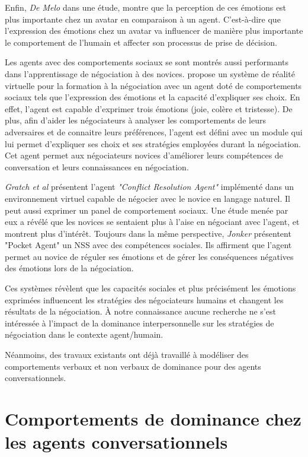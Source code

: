 	Enfin, \emph{De Melo} \cite{de2015humans} dans une étude, montre que la perception de ces émotions est plus importante chez un avatar en comparaison à un agent. C'est-à-dire que l'expression des émotions chez un avatar va influencer de manière plus importante le comportement de l'humain et affecter son processus de prise de décision.  
	
	Les agents avec des comportements sociaux se sont montrés aussi performants dans l'apprentissage de négociation à des novices. \cite{broekens2012virtual} propose un système de réalité virtuelle pour la formation à la négociation avec un agent doté de comportements sociaux tels que l'expression des émotions et la capacité d'expliquer ses choix. En effet, l'agent est capable d'exprimer trois émotions (joie, colère et tristesse). De plus, afin d'aider les négociateurs à analyser les comportements de leurs adversaires et de connaitre leurs préférences, l'agent est défini avec un module qui lui permet d'expliquer ses choix et ses stratégies employées durant la négociation. Cet agent permet aux négociateurs novices d'améliorer leurs compétences de conversation et leurs connaissances en négociation. 
	
	\emph{Gratch et al} \cite{gratch2016benefits} présentent l'agent \textit{"Conflict Resolution Agent"} implémenté dans un environnement virtuel capable de négocier avec le novice en langage naturel. Il peut aussi exprimer un panel de comportement sociaux. Une étude menée par eux a révélé que les novices se sentaient plus à l'aise en négociant avec l'agent, et montrent plus d'intérêt. Toujours dans la même perspective, \emph{Jonker} \cite{jonker2012negotiating} présentent "Pocket Agent" un NSS avec des compétences sociales. Ils affirment que l'agent permet au novice de réguler ses émotions et de gérer les conséquences négatives des émotions lors de la négociation.
	
	Ces systèmes révèlent que les capacités sociales et plus précisément les émotions exprimées influencent les stratégies des négociateurs humains et changent les résultats de la négociation. À notre connaissance aucune recherche ne s'est intéressée à l'impact de la dominance interpersonnelle sur les stratégies de négociation dans le contexte agent/humain. 
	
	Néanmoins, des travaux existants ont déjà travaillé à modéliser des comportements verbaux et non verbaux de dominance pour des agents conversationnels. 
	
	\section{Comportements de dominance chez les agents conversationnels}
	
